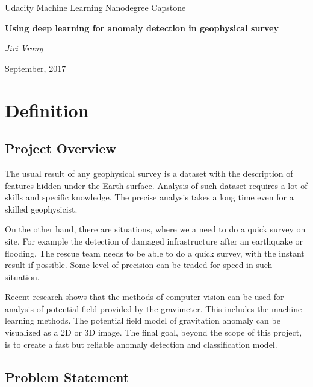 \documentclass{article}
\begin{document}
\begin{titlepage}
    \begin{center}
        \Large{Udacity Machine Learning Nanodegree Capstone}
        
        \LARGE\textbf{Using deep learning for anomaly detection in geophysical survey}
        
        \vspace{1cm}
        \large\textit{Jiri Vrany}
        
        \normalsize{September, 2017}
    \end{center}
\end{titlepage}


\section{Definition}\label{i.-definition}

\subsection{Project Overview}\label{project-overview}

The usual result of any geophysical survey is a dataset with the
description of features hidden under the Earth surface. Analysis of such
dataset requires a lot of skills and specific knowledge. The precise
analysis takes a long time even for a skilled geophysicist.

On the other hand, there are situations, where we a need to do a quick
survey on site. For example the detection of damaged infrastructure
after an earthquake or flooding. The rescue team needs to be able to do
a quick survey, with the instant result if possible. Some level of
precision can be traded for speed in such situation.

Recent research shows that the methods of computer vision can be used
for analysis of potential field provided by the gravimeter. This
includes the machine learning methods. The potential field model of
gravitation anomaly \cite{salem}
can be visualized as a 2D or 3D image. The final goal, beyond the scope
of this project, is to create a fast but reliable anomaly detection and
classification model.

\subsection{Problem Statement}\label{problem-statement}
\end{document}
